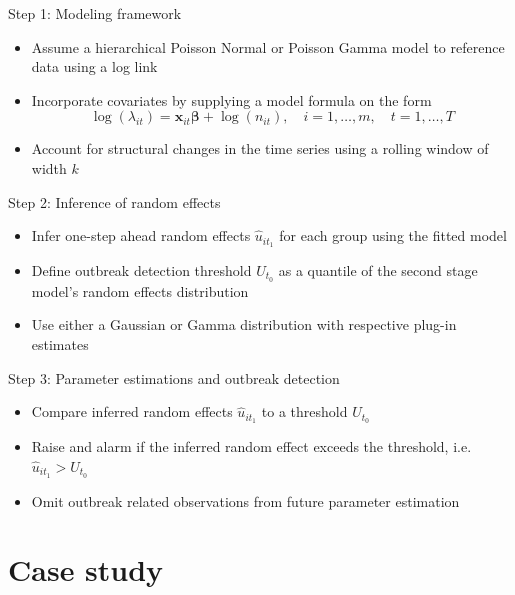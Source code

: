 \documentclass[aspectratio=169]{beamer}
\begin{document}
\begin{frame}{Step 1: Modeling framework}
\protect\hypertarget{step-1-modeling-framework}{}
\begin{itemize}
  \item Assume a hierarchical Poisson Normal or Poisson Gamma model to reference data using a log link
  \item Incorporate covariates by supplying a model formula on the form
  \begin{equation}
    \log(\lambda_{it})=\boldsymbol x_{it}\boldsymbol \beta+\log(n_{it}), \quad i=1,\dots,m, \quad t=1,\dots,T
  \end{equation}
  \item Account for structural changes in the time series using a rolling window of width $k$
\end{itemize}
\end{frame}

\begin{frame}{Step 2: Inference of random effects}
\protect\hypertarget{step-2-inference-of-random-effects}{}
\begin{itemize}
  \item Infer one-step ahead random effects $\hat u_{i{t_1}}$ for each group using the fitted model
  \item Define outbreak detection threshold $U_{t_0}$ as a quantile of the second stage model's random effects distribution
  \item Use either a Gaussian or Gamma distribution with respective plug-in estimates
\end{itemize}
\end{frame}

\begin{frame}{Step 3: Parameter estimations and outbreak detection}
\protect\hypertarget{step-3-parameter-estimations-and-outbreak-detection}{}
\begin{itemize}
  \item Compare inferred random effects $\hat u_{i{t_1}}$ to a threshold $U_{t_0}$
  \item Raise and alarm if the inferred random effect exceeds the threshold, i.e. $\hat u_{i{t_1}}>U_{t_0}$
  \item Omit outbreak related observations from future parameter estimation
\end{itemize}
\end{frame}

\hypertarget{case-study}{%
\section{Case study}\label{case-study}}
\end{document}
